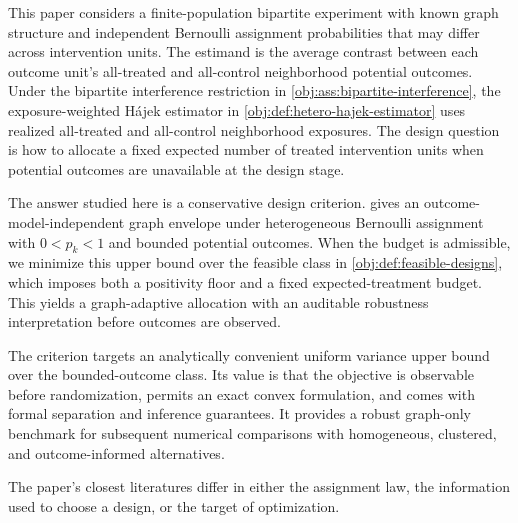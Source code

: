 \documentclass[11pt]{article}
\begin{document}
This paper considers a finite-population bipartite experiment with known graph structure and independent Bernoulli assignment probabilities that may differ across intervention units. The estimand is the average contrast between each outcome unit's all-treated and all-control neighborhood potential outcomes. Under the bipartite interference restriction in \cref{obj:ass:bipartite-interference}, the exposure-weighted Hájek estimator in \cref{obj:def:hetero-hajek-estimator} uses realized all-treated and all-control neighborhood exposures. The design question is how to allocate a fixed expected number of treated intervention units when potential outcomes are unavailable at the design stage.

The answer studied here is a conservative design criterion.  gives an outcome-model-independent graph envelope under heterogeneous Bernoulli assignment with \(0<p_k<1\) and bounded potential outcomes. When the budget is admissible, we minimize this upper bound over the feasible class in \cref{obj:def:feasible-designs}, which imposes both a positivity floor and a fixed expected-treatment budget. This yields a graph-adaptive allocation with an auditable robustness interpretation before outcomes are observed.

The criterion targets an analytically convenient uniform variance upper bound over the bounded-outcome class. Its value is that the objective is observable before randomization, permits an exact convex formulation, and comes with formal separation and inference guarantees. It provides a robust graph-only benchmark for subsequent numerical comparisons with homogeneous, clustered, and outcome-informed alternatives.

The paper's closest literatures differ in either the assignment law, the information used to choose a design, or the target of optimization.
\end{document}
